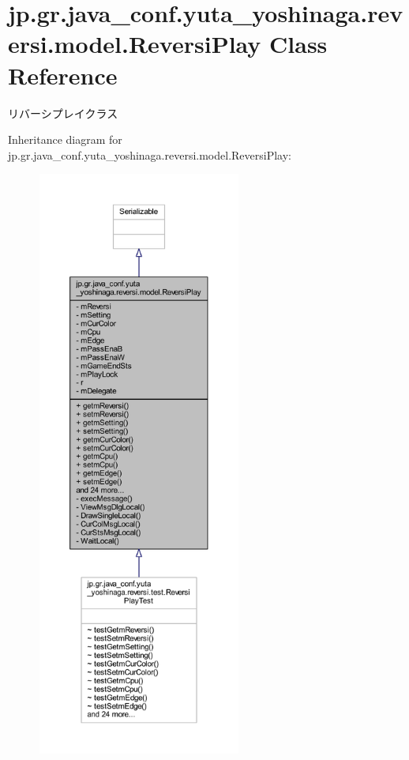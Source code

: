 \hypertarget{classjp_1_1gr_1_1java__conf_1_1yuta__yoshinaga_1_1reversi_1_1model_1_1_reversi_play}{}\section{jp.\+gr.\+java\+\_\+conf.\+yuta\+\_\+yoshinaga.\+reversi.\+model.\+Reversi\+Play Class Reference}
\label{classjp_1_1gr_1_1java__conf_1_1yuta__yoshinaga_1_1reversi_1_1model_1_1_reversi_play}


リバーシプレイクラス  




Inheritance diagram for jp.\+gr.\+java\+\_\+conf.\+yuta\+\_\+yoshinaga.\+reversi.\+model.\+Reversi\+Play\+:\nopagebreak
\begin{figure}[H]
\begin{center}
\leavevmode
\includegraphics[height=550pt]{classjp_1_1gr_1_1java__conf_1_1yuta__yoshinaga_1_1reversi_1_1model_1_1_reversi_play__inherit__graph}
\end{center}
\end{figure}


